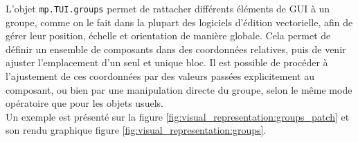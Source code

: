 \noindent L'objet \verb|mp.TUI.groups| permet de rattacher différents éléments de \gls{GUI} à un groupe, comme on le fait dans la plupart des logiciels d'édition vectorielle, afin de gérer leur position, échelle et orientation de manière globale. Cela permet de définir un ensemble de composants dans des coordonnées relatives, puis de venir ajuster l'emplacement d'un seul et unique bloc. Il est possible de procéder à l'ajustement de ces coordonnées par des valeurs passées explicitement au composant, ou bien par une manipulation directe du groupe, selon le même mode opératoire que pour les objets usuels.\\
\indent Un exemple est présenté sur la figure \ref{fig:visual_representation:groups_patch} et son rendu graphique figure \ref{fig:visual_representation:groups}.

